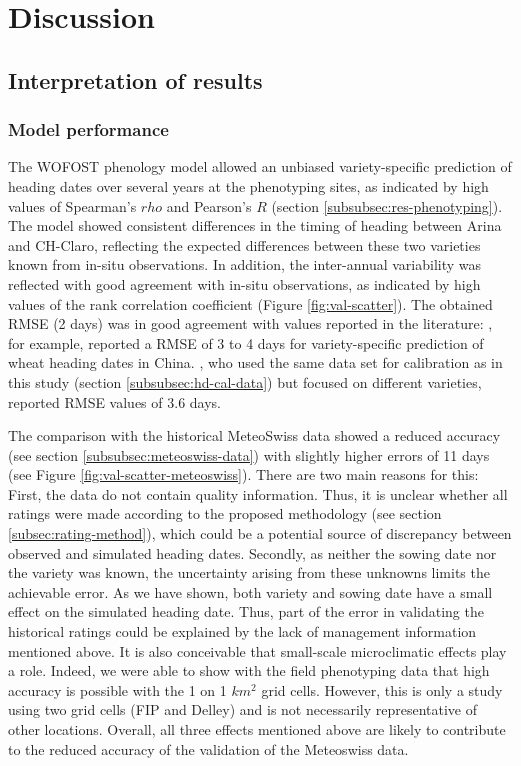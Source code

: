 \section{Discussion}
\label{sec:hd-discussion}
\subsection{Interpretation of results}
\subsubsection{Model performance}
The \gls{WOFOST} phenology model allowed an unbiased variety-specific prediction of heading dates over several years at the phenotyping sites, as indicated by high values of Spearman's $rho$ and Pearson's $R$ (section \ref{subsubsec:res-phenotyping}). The model showed consistent differences in the timing of heading between Arina and CH-Claro, reflecting the expected differences between these two varieties known from in-situ observations. In addition, the inter-annual variability was reflected with good agreement with in-situ observations, as indicated by high values of the rank correlation coefficient (Figure \ref{fig:val-scatter}). The obtained \gls{RMSE} (2 days) was in good agreement with values reported in the literature: \cite{liu_uncertainty_2018}, for example, reported a \gls{RMSE} of 3 to 4 days for variety-specific prediction of wheat heading dates in China. \cite{rogger_can_2021}, who used the same data set for calibration as in this study (section \ref{subsubsec:hd-cal-data}) but focused on different varieties, reported \gls{RMSE} values of 3.6 days.

The comparison with the historical MeteoSwiss data showed a reduced accuracy (see section \ref{subsubsec:meteoswiss-data}) with slightly higher errors of 11 days (see Figure \ref{fig:val-scatter-meteoswiss}). There are two main reasons for this: First, the data do not contain quality information. Thus, it is unclear whether all ratings were made according to the proposed methodology (see section \ref{subsec:rating-method}), which could be a potential source of discrepancy between observed and simulated heading dates. Secondly, as neither the sowing date nor the variety was known, the uncertainty arising from these unknowns limits the achievable error. As we have shown, both variety and sowing date have a small effect on the simulated heading date. Thus, part of the error in validating the historical ratings could be explained by the lack of management information mentioned above. It is also conceivable that small-scale microclimatic effects play a role. Indeed, we were able to show with the field phenotyping data that high accuracy is possible with the 1 on 1 $km^2$ grid cells. However, this is only a study using two grid cells (FIP and Delley) and is not necessarily representative of other locations. Overall, all three effects mentioned above are likely to contribute to the reduced accuracy of the validation of the Meteoswiss data.

